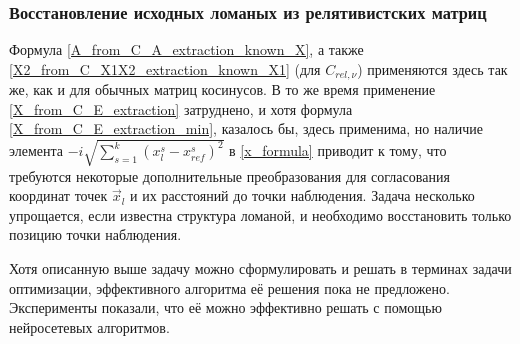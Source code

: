 \subsubsection{Восстановление исходных ломаных из релятивистских матриц}
Формула \ref{A_from_C_A_extraction_known_X}, а также \ref{X2_from_C_X1X2_extraction_known_X1} (для $C_{rel,\nu}$) применяются здесь так же, как и для обычных матриц косинусов.
В то же время применение \ref{X_from_C_E_extraction} затруднено, и хотя формула \ref{X_from_C_E_extraction_min}, казалось бы, здесь применима,
но наличие элемента $-i\sqrt{\sum_{s=1}^{k}(x^s_l - x^s_{ref})^2}$ в \ref{x_formula} приводит к тому,
что требуются некоторые дополнительные преобразования для согласования координат точек $\vec{x}_l$ и их расстояний до точки наблюдения.
Задача несколько упрощается, если известна структура ломаной, и необходимо восстановить только позицию точки наблюдения.

Хотя описанную выше задачу можно сформулировать и решать в терминах задачи оптимизации, эффективного алгоритма её решения пока не предложено.
Эксперименты показали, что её можно эффективно решать с помощью нейросетевых алгоритмов.




